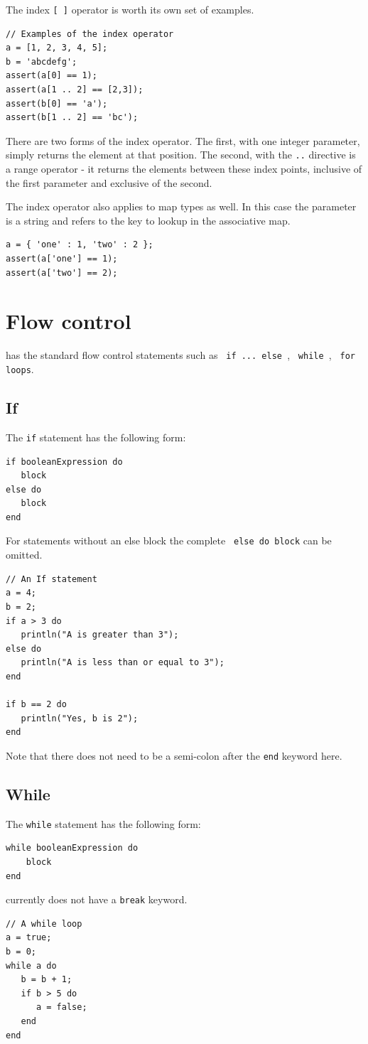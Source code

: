 The index \verb+[ ]+ operator is worth its own set of examples.
\begin{lstlisting}[caption={Index operator}]
// Examples of the index operator
a = [1, 2, 3, 4, 5];
b = 'abcdefg';
assert(a[0] == 1);
assert(a[1 .. 2] == [2,3]);
assert(b[0] == 'a');
assert(b[1 .. 2] == 'bc');
\end{lstlisting}
There are two forms of the index operator. The first, with one integer parameter, simply returns the element at that position. The second, with the \verb+..+ directive is a range operator - it returns the elements between these index points, inclusive of the first parameter and exclusive of the second.

The index operator also applies to map types as well. In this case the parameter is a string and refers to the key to lookup in the associative map.
\begin{lstlisting}[caption={Index operator on maps}]
a = { 'one' : 1, 'two' : 2 };
assert(a['one'] == 1);
assert(a['two'] == 2);
\end{lstlisting}

\chapter{Flow control}
\Reflex has the standard flow control statements such as \verb+ if ... else +, \verb+ while +, \verb+ for loops+. 
\section{If}
The \Reflex \verb+if+  statement has the following form:
\begin{verbatim}
if booleanExpression do
   block
else do
   block
end
\end{verbatim}
For statements without an else  block the complete \verb+ else do block+ can be omitted.

\begin{lstlisting}[caption={If statement}]
// An If statement
a = 4;
b = 2;
if a > 3 do
   println("A is greater than 3");
else do 
   println("A is less than or equal to 3");
end

if b == 2 do
   println("Yes, b is 2");
end
\end{lstlisting}
Note that there does not need to be a semi-colon after the \verb+end+ keyword here.
\section{While}
The \Reflex \verb+while+ statement has the following form:
\begin{verbatim}
while booleanExpression do
    block
end
\end{verbatim}
\Reflex currently does not have a \verb+break+ keyword.
\begin{lstlisting}[caption={While statement}]
// A while loop
a = true;
b = 0;
while a do
   b = b + 1;
   if b > 5 do
      a = false;
   end
end
\end{lstlisting}
